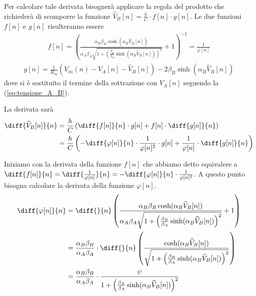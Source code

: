 		Per calcolare tale derivata bisognerà applicare la regola del prodotto che richiederà di scomporre la funzione $\widehat V_{B}[n] = \frac{h}{C}\cdot f[n]\cdot g[n]$.
		Le due funzioni $f[n]$ e $g[n]$ risulteranno essere
		\begin{equation}
			\begin{split}
				f[n] = \left(\frac{\alpha_{B}\beta_{B}\cosh(\alpha_{B}\widehat V_{B}[n])}{\alpha_{A}\beta_{A}\sqrt{1+\left(\frac{\beta_{B}}{\beta_{A}}\sinh(\alpha_{B}\widehat V_{B}[n])\right)^{2}}}+1\right)^{-1} = \frac{1}{\varphi[n]}
			\end{split}
		\end{equation}
		\begin{equation}
			\begin{split}
				g[n] = \frac{1}{R_{in}}\left(V_{in}(n)-V_{A}[n]-\widehat V_{B}[n]\right)-2\beta_{B}\sinh(\alpha_{B}\widehat V_{B}[n])
			\end{split}
		\end{equation}
		dove si è sostituito il termine della sottrazione con $V_{A}[n]$ seguendo la (\ref{eq:tensione_A_B}).

		La derivata sarà
		\begin{equation}
			\label{eq:jacobiano}
			\begin{split}
				\diff{\widehat V_{B}[n]}{n} &= \frac{h}{C}\left(\diff{f[n]}{n}\cdot g[n]+f[n]\cdot \diff{g[n]}{n}\right)\\
				&= \frac{h}{C}\left(-\diff{\varphi[n]}{n}\cdot\frac{1}{\varphi[n]^{2}}\cdot g[n]+\frac{1}{\varphi[n]}\cdot \diff{g[n]}{n}\right)
			\end{split}
		\end{equation}

		Iniziamo con la derivata della funzione $f[n]$ che abbiamo detto equivalere a $\diff{f[n]}{n} = \diff{\frac{1}{\varphi[n]}}{n} = -\diff{\varphi[n]}{n}\cdot\frac{1}{\varphi[n]^{2}}$. A questo punto bisogna calcolare la derivata della funzione $\varphi[n]$.
		\begin{equation}
			\begin{split}
				\diff{\varphi[n]}{n} &= \diff{}{n}\left(\frac{\alpha_{B}\beta_{B}\cosh(\alpha_{B}\widehat V_{B}[n])}{\alpha_{A}\beta_{A}\sqrt{1+\left(\frac{\beta_{B}}{\beta_{A}}\sinh(\alpha_{B}\widehat V_{B}[n])\right)^{2}}}+1\right)\\
				&= \frac{\alpha_{B}\beta_{B}}{\alpha_{A}\beta_{A}}\cdot\diff{}{n}\left(\frac{\cosh(\alpha_{B}\widehat V_{B}[n])}{\sqrt{1+\left(\frac{\beta_{B}}{\beta_{A}}\sinh(\alpha_{B}\widehat V_{B}[n])\right)^{2}}}\right)\\
				&= \frac{\alpha_{B}\beta_{B}}{\alpha_{A}\beta_{A}}\cdot\frac{\psi}{1+\left(\frac{\beta_{B}}{\beta_{A}}\sinh(\alpha_{B}\widehat V_{B}[n])\right)^{2}}
			\end{split}
		\end{equation}
		
